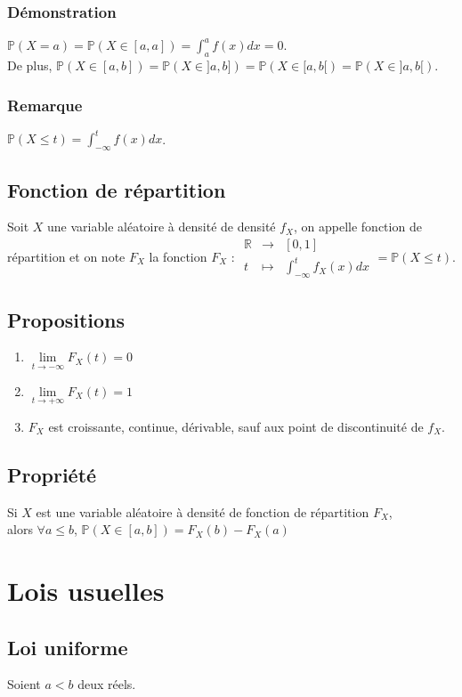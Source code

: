 \documentclass[a4paper,10pt]{book} %
\newcommand{\R}{\mathbb{R}}
\renewcommand{\P}{\mathbb{P}} %
\begin{document}
\subsubsection{Démonstration}
$\P(X=a)=\P(X\in[a,a])=\int_a^af(x)dx=0$.\\

De plus, $\P(X\in [a,b])=\P(X\in ]a,b])= \P(X\in [a,b[)=\P(X\in ]a,b[)$.

\subsubsection{Remarque}
$\P(X\leq t) = \int_{-\infty}^t f(x)dx$.

\subsection{Fonction de répartition}
Soit $X$ une variable aléatoire à densité de densité $f_X$, on appelle fonction de répartition et on note $F_X$ la fonction $F_X$ : $\begin{array}{rcl}\R&\rightarrow&[0,1]\\t &\mapsto& \int_{-\infty}^tf_X(x)dx\end{array}=\P(X\leq t)$.

\subsection{Propositions}
\begin{enumerate}
\item $\lim\limits_{t\rightarrow -\infty} F_X(t)=0$
\item $\lim\limits_{t\rightarrow +\infty} F_X(t)=1$
\item $F_X$ est croissante, continue, dérivable, sauf aux point de discontinuité de $f_X$.
\end{enumerate}

\subsection{Propriété}
Si $X$ est une variable aléatoire à densité de fonction de répartition $F_X$,\\
alors $\forall a\leq b$, $\P(X\in [a,b])=F_X(b)-F_X(a)$

\section{Lois usuelles}
\subsection{Loi uniforme}
Soient $a<b$ deux réels.\\
\end{document}
